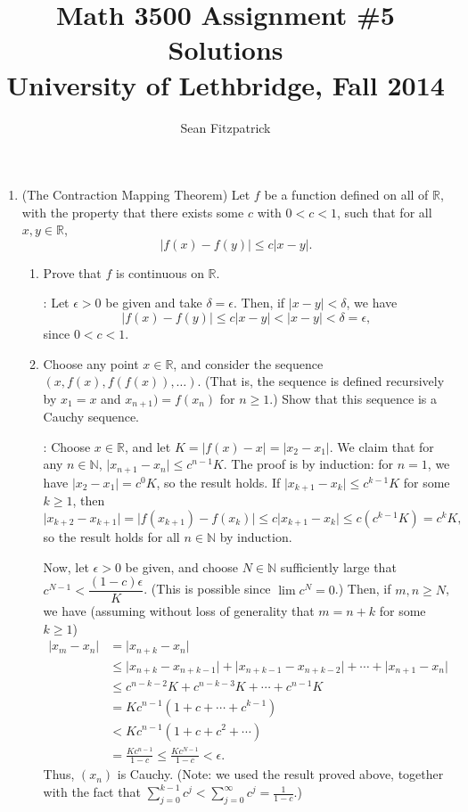 \documentclass[letterpaper,12pt]{article}
\title{Math 3500 Assignment \#5 Solutions\\University of Lethbridge, Fall 2014}
\author{Sean Fitzpatrick}
\newcommand{\R}{\mathbb{R}}
\newcommand{\N}{\mathbb{N}}
\newcommand{\abs}[1]{\lvert #1\rvert}
\begin{document}
 \maketitle
\begin{enumerate}
 \item (The Contraction Mapping Theorem) Let $f$ be a function defined on all of $\R$, with the property that there exists some $c$ with $0<c<1$, such that for all $x, y\in \R$,
\[
 \abs{f(x)-f(y)}\leq c\abs{x-y}.
\]
\begin{enumerate}
 \item Prove that $f$ is continuous on $\R$.

\bigskip

: Let $\epsilon>0$ be given and take $\delta=\epsilon$. Then, if $\abs{x-y}<\delta$, we have
\[
 \abs{f(x)-f(y)}\leq c\abs{x-y}<\abs{x-y}<\delta=\epsilon,
\]
since $0<c<1$.

\bigskip

 \item Choose any point $x\in\R$, and consider the sequence $(x,f(x),f(f(x)),\ldots)$. (That is, the sequence is defined recursively by $x_1=x$ and $x_{n+1}) = f(x_n)$ for $n\geq 1$.) Show that this sequence is a Cauchy sequence.

\bigskip

: Choose $x\in\R$, and let $K=\abs{f(x)-x}=\abs{x_2-x_1}$. We claim that for any $n\in\N$, $\abs{x_{n+1}-x_n} \leq c^{n-1}K$. The proof is by induction: for $n=1$, we have $\abs{x_2-x_1} = c^0 K$, so the result holds. If $\abs{x_{k+1}-x_k}\leq c^{k-1}K$ for some $k\geq 1$, then
\[
 \abs{x_{k+2}-x_{k+1}} =\abs{f(x_{k+1})-f(x_{k})} \leq c \abs{x_{k+1}-x_k} \leq c (c^{k-1}K) = c^kK,
\]
so the result holds for all $n\in\N$ by induction.

Now, let $\epsilon>0$ be given, and choose $N\in\N$ sufficiently large that $c^{N-1}<\dfrac{(1-c)\epsilon}{K}$. (This is possible since $\lim c^N = 0$.) Then, if $m,n\geq N$, we have (assuming without loss of generality that $m=n+k$ for some $k\geq 1$)
\begin{align*}
 \abs{x_m-x_n} & = \abs{x_{n+k}-x_n}\\
 & \leq \abs{x_{n+k}-x_{n+k-1}}+\abs{x_{n+k-1}-x_{n+k-2}}+\cdots + \abs{x_{n+1}-x_n}\\
 & \leq c^{n-k-2}K + c^{n-k-3}K + \cdots + c^{n-1}K\\
 & = Kc^{n-1}(1+c+\cdots + c^{k-1})\\
 & < Kc^{n-1}(1+c+c^2+\cdots)\\
 & = \frac{Kc^{n-1}}{1-c} \leq \frac{Kc^{N-1}}{1-c}< \epsilon.
\end{align*}
Thus, $(x_n)$ is Cauchy. (Note: we used the result proved above, together with the fact that $\sum_{j=0}^{k-1}c^j<\sum_{j=0}^\infty c^j = \frac{1}{1-c}$.)


\end{enumerate}
\end{enumerate}
\end{document}
